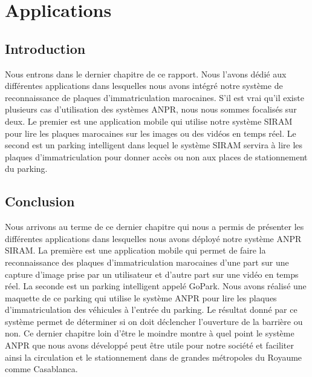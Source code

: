 \chapter{\textbf{Applications}}
    \section{Introduction}
    Nous entrons dans le dernier chapitre de ce rapport. Nous l’avons dédié aux différentes applications dans lesquelles nous avons intégré notre système de reconnaissance de plaques d’immatriculation marocaines. S’il est vrai qu’il existe plusieurs cas d’utilisation des systèmes ANPR, nous nous sommes focalisés sur deux. Le premier est une application mobile qui utilise notre système SIRAM pour lire les plaques marocaines sur les images ou des vidéos en temps réel. Le second est un parking intelligent dans lequel le système SIRAM servira à lire les plaques d’immatriculation pour donner accès ou non aux places de stationnement du parking.

    
    
    
    \section{Conclusion}
    Nous arrivons au terme de ce dernier chapitre qui nous a permis de présenter les différentes applications dans lesquelles nous avons déployé notre système ANPR SIRAM. La première est une application mobile qui permet de faire la reconnaissance des plaques d’immatriculation marocaines d’une part  sur une capture d’image prise par un utilisateur et d’autre part sur une vidéo en temps réel. La seconde est un parking intelligent appelé GoPark. Nous avons réalisé une maquette de ce parking qui utilise le système ANPR pour lire les plaques d’immatriculation des véhicules à l’entrée du parking. Le résultat donné par ce système permet de déterminer si on doit déclencher l’ouverture de la barrière ou non. Ce dernier chapitre loin d’être le moindre montre à quel point le système ANPR que nous avons développé peut être utile pour notre société et faciliter ainsi la circulation et le stationnement dans de grandes métropoles du Royaume comme Casablanca. 
